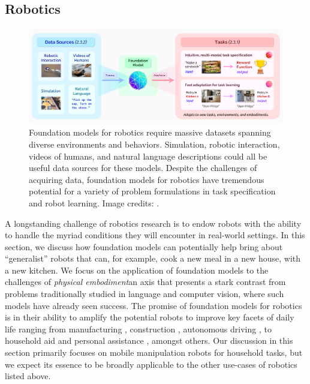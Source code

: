 \newsection
\subsection{Robotics}
\label{sec:robotics}

\begin{figure}[!ht]
\centering
\includegraphics[width=\linewidth]{capabilities/figures/Robotics.png}
\caption{Foundation models for robotics require massive datasets spanning diverse environments and behaviors. Simulation, robotic interaction, videos of humans, and natural language descriptions could all be useful data sources for these models. Despite the challenges of acquiring data, foundation models for robotics have tremendous potential for a variety of problem formulations in task specification and robot learning. Image credits: \cite{finn2016deep, szot2021habitat}.}
\label{fig:robotics}
\end{figure}

\noindent 
A longstanding challenge of robotics research is to endow robots with the ability to handle the myriad conditions they will encounter in real-world settings. In this section, we discuss how foundation models can potentially help bring about ``generalist'' robots that can, for example, cook a new meal in a new house, with a new kitchen. We focus on the application of foundation models to the challenges of \textit{physical embodiment}\dash{}an axis that presents a stark contrast from problems traditionally studied in language and computer vision, where such models have already seen success. The promise of foundation models for robotics is in their ability to amplify the potential robots to improve key facets of daily life ranging from manufacturing \citep{nof1999handbook, sanneman2020state}, construction \citep{khoshnevis2004automated, bock2007construction}, autonomous driving \citep{thorpe1988vision, badue2020self}, to household aid \citep{thrun1995lifelong, brooks2002flesh, Dillmann2004TeachingAL, goodrich2007hri, Gupta2018RobotLI, shridhar2020alfred} and personal assistance \citep{dragan2013formalizing, javdani2018shared}, amongst others. Our discussion in this section primarily focuses on mobile manipulation robots for household tasks, but we expect its essence to be broadly applicable to the other use-cases of robotics listed above.

